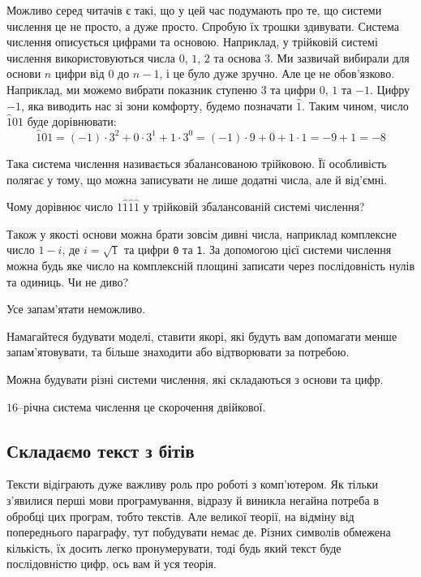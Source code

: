 \documentclass{book}
\newcommand{\bitstr}[1]{{\tt #1}}
\begin{document}
Можливо серед читачів є такі, що у цей час подумають про те, що системи числення це не просто, а дуже просто.
Спробую їх трошки здивувати.
Система числення описується цифрами та основою.
Наприклад, у трійковій системі числення використовуються числа $0$, $1$, $2$ та основа $3$.
Ми зазвичай вибирали для основи $n$ цифри від $0$ до $n-1$, і це було дуже зручно.
Але це не обов'язково.
Наприклад, ми можемо вибрати показник ступеню $3$ та цифри $0$, $1$ та $-1$.
Цифру $-1$, яка виводить нас зі зони комфорту, будемо позначати $\hat 1$.
Таким чином, число $\hat 101$ буде дорівнювати:
$$
  \hat 101 = (-1) \cdot 3^2 + 0 \cdot 3^1 + 1 \cdot 3^0 = (-1) \cdot 9 + 0 + 1 \cdot 1 = -9 + 1 = -8
$$

Така система числення називається збалансованою трійковою.
Її особливість полягає у тому, що можна записувати не лише додатні числа, але й від'ємні.

\begin{exercise}
Чому дорівнює число $1\hat1\hat1\hat1$ у трійковій збалансованій системі числення?
\end{exercise}

Також у якості основи можна брати зовсім дивні числа, наприклад комплексне число $1-i$, де $i=\sqrt{1}$ та цифри \bitstr{0} та \bitstr{1}.
За допомогою цієї системи числення можна будь яке число на комплексній площині записати через послідовність нулів та одиниць.
Чи не диво?

\begin{summary}
\item Усе запам'ятати неможливо.
\item Намагайтеся будувати моделі, ставити якорі, які будуть вам допомагати менше запам'ятовувати, та більше знаходити або відтворювати за потребою.
\item Можна будувати різні системи числення, які складаються з основи та цифр.
\item $16$--річна система числення це скорочення двійкової.
\end{summary}

\subsection{Складаємо текст з бітів}

Тексти відіграють дуже важливу роль про роботі з комп'ютером.
Як тільки з'явилися перші мови програмування, відразу й виникла негайна потреба в обробці цих програм, тобто текстів.
Але великої теорії, на відміну від попереднього параграфу, тут побудувати немає де.
Різних символів обмежена кількість, їх досить легко пронумерувати, тоді будь який текст буде послідовністю цифр, ось вам й уся теорія.
\end{document}
